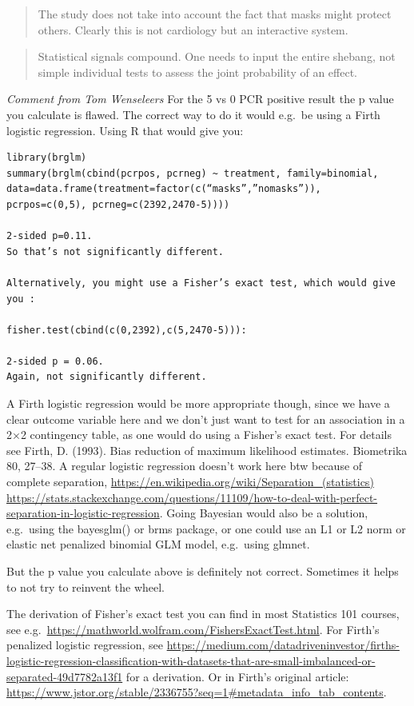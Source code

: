 \documentclass[
]{book}
\begin{document}
\begin{quote}
The study does not take into account the fact that masks might protect others. Clearly this is not cardiology but an interactive system.
\end{quote}

\begin{quote}
Statistical signals compound. One needs to input the entire shebang, not simple individual tests to assess the joint probability of an effect.
\end{quote}

\emph{Comment from Tom Wenseleers}
For the 5 vs 0 PCR positive result the p value you calculate is flawed. The correct way to do it would e.g.~be using a Firth logistic regression. Using R that would give you:

\begin{verbatim}
library(brglm)
summary(brglm(cbind(pcrpos, pcrneg) ~ treatment, family=binomial, data=data.frame(treatment=factor(c(“masks”,”nomasks”)),
pcrpos=c(0,5), pcrneg=c(2392,2470-5))))

2-sided p=0.11.
So that’s not significantly different.

Alternatively, you might use a Fisher’s exact test, which would give you :

fisher.test(cbind(c(0,2392),c(5,2470-5))):

2-sided p = 0.06.
Again, not significantly different.
\end{verbatim}

A Firth logistic regression would be more appropriate though, since we have a clear outcome variable here and we don't just want to test for an association in a 2×2 contingency table, as one would do using a Fisher's exact test. For details see Firth, D. (1993). Bias reduction of maximum likelihood estimates. Biometrika 80, 27--38. A regular logistic regression doesn't work here btw because of complete separation, \url{https://en.wikipedia.org/wiki/Separation_(statistics)} \url{https://stats.stackexchange.com/questions/11109/how-to-deal-with-perfect-separation-in-logistic-regression}. Going Bayesian would also be a solution, e.g.~using the bayesglm() or brms package, or one could use an L1 or L2 norm or elastic net penalized binomial GLM model, e.g.~using glmnet.

But the p value you calculate above is definitely not correct. Sometimes it helps to not try to reinvent the wheel.

The derivation of Fisher's exact test you can find in most Statistics 101 courses, see e.g.~\url{https://mathworld.wolfram.com/FishersExactTest.html}. For Firth's penalized logistic regression, see \url{https://medium.com/datadriveninvestor/firths-logistic-regression-classification-with-datasets-that-are-small-imbalanced-or-separated-49d7782a13f1} for a derivation. Or in Firth's original article: \url{https://www.jstor.org/stable/2336755?seq=1\#metadata_info_tab_contents}.
\end{document}
